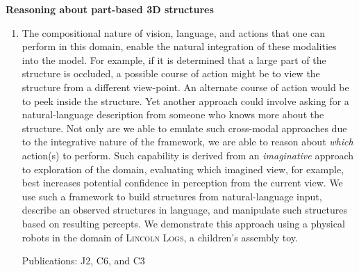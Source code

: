 \documentclass[10pt]{article}
\newenvironment{researchBlock}[1]{%
  \vspace*{0.5ex}
  {\large \textbf{#1}}
  \begin{enumerate}\item[]}
  {\end{enumerate}}
\newcommand{\refr}[1]{{\color{RoyalBlue} #1}}
\newcommand{\LincolnLogs}{\textsc{Lincoln Logs}}
\begin{document}
\begin{researchBlock} {Reasoning about part-based 3D structures}
  The compositional nature of vision, language, and actions that one can
  perform in this domain, enable the natural integration of these modalities
  into the model.
  For example, if it is determined that a large part of the structure is
  occluded, a possible course of action might be to view the structure from a
  different view-point.
  An alternate course of action would be to peek inside the structure.
  Yet another approach could involve asking for a natural-language description
  from someone who knows more about the structure.
  Not only are we able to emulate such cross-modal approaches due to the
  integrative nature of the framework, we are able to reason about \emph{which}
  action(s) to perform.
  Such capability is derived from an \emph{imaginative} approach to exploration
  of the domain, evaluating which imagined view, for example, best increases
  potential confidence in perception from the current view.
  We use such a framework to build structures from natural-language input,
  describe an observed structures in language, and manipulate such structures
  based on resulting percepts. We demonstrate this approach using a physical
  robots in the domain of \LincolnLogs, a children's assembly toy.

  Publications: \refr{J2}, \refr{C6}, and \refr{C3}
\end{researchBlock}
\end{document}
